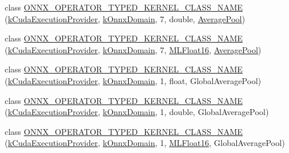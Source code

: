 \begin{DoxyCompactItemize}
\item 
class \mbox{\hyperlink{namespaceonnxruntime_1_1cuda_ad3067b89c02f4a5f6be82c8028514781}{O\+N\+N\+X\+\_\+\+O\+P\+E\+R\+A\+T\+O\+R\+\_\+\+T\+Y\+P\+E\+D\+\_\+\+K\+E\+R\+N\+E\+L\+\_\+\+C\+L\+A\+S\+S\+\_\+\+N\+A\+ME}} (\mbox{\hyperlink{namespaceonnxruntime_a73ebc64887ddd1968e3cef47ffefe35b}{k\+Cuda\+Execution\+Provider}}, \mbox{\hyperlink{namespaceonnxruntime_ac0e7c0c106a2c9e9594560a3ab289fa0}{k\+Onnx\+Domain}}, 7, double, \mbox{\hyperlink{classonnxruntime_1_1AveragePool}{Average\+Pool}})
\item 
class \mbox{\hyperlink{namespaceonnxruntime_1_1cuda_a47aac2996848710ff2bb2fd0638f6d43}{O\+N\+N\+X\+\_\+\+O\+P\+E\+R\+A\+T\+O\+R\+\_\+\+T\+Y\+P\+E\+D\+\_\+\+K\+E\+R\+N\+E\+L\+\_\+\+C\+L\+A\+S\+S\+\_\+\+N\+A\+ME}} (\mbox{\hyperlink{namespaceonnxruntime_a73ebc64887ddd1968e3cef47ffefe35b}{k\+Cuda\+Execution\+Provider}}, \mbox{\hyperlink{namespaceonnxruntime_ac0e7c0c106a2c9e9594560a3ab289fa0}{k\+Onnx\+Domain}}, 7, \mbox{\hyperlink{uniononnxruntime_1_1MLFloat16}{M\+L\+Float16}}, \mbox{\hyperlink{classonnxruntime_1_1AveragePool}{Average\+Pool}})
\item 
class \mbox{\hyperlink{namespaceonnxruntime_1_1cuda_aeedcbf0683595b738f01bfce9fa10987}{O\+N\+N\+X\+\_\+\+O\+P\+E\+R\+A\+T\+O\+R\+\_\+\+T\+Y\+P\+E\+D\+\_\+\+K\+E\+R\+N\+E\+L\+\_\+\+C\+L\+A\+S\+S\+\_\+\+N\+A\+ME}} (\mbox{\hyperlink{namespaceonnxruntime_a73ebc64887ddd1968e3cef47ffefe35b}{k\+Cuda\+Execution\+Provider}}, \mbox{\hyperlink{namespaceonnxruntime_ac0e7c0c106a2c9e9594560a3ab289fa0}{k\+Onnx\+Domain}}, 1, float, Global\+Average\+Pool)
\item 
class \mbox{\hyperlink{namespaceonnxruntime_1_1cuda_ad0765b349cb2924d12a3136537ee7cac}{O\+N\+N\+X\+\_\+\+O\+P\+E\+R\+A\+T\+O\+R\+\_\+\+T\+Y\+P\+E\+D\+\_\+\+K\+E\+R\+N\+E\+L\+\_\+\+C\+L\+A\+S\+S\+\_\+\+N\+A\+ME}} (\mbox{\hyperlink{namespaceonnxruntime_a73ebc64887ddd1968e3cef47ffefe35b}{k\+Cuda\+Execution\+Provider}}, \mbox{\hyperlink{namespaceonnxruntime_ac0e7c0c106a2c9e9594560a3ab289fa0}{k\+Onnx\+Domain}}, 1, double, Global\+Average\+Pool)
\item 
class \mbox{\hyperlink{namespaceonnxruntime_1_1cuda_aa3735b4aafabdcd17b152488004e92f5}{O\+N\+N\+X\+\_\+\+O\+P\+E\+R\+A\+T\+O\+R\+\_\+\+T\+Y\+P\+E\+D\+\_\+\+K\+E\+R\+N\+E\+L\+\_\+\+C\+L\+A\+S\+S\+\_\+\+N\+A\+ME}} (\mbox{\hyperlink{namespaceonnxruntime_a73ebc64887ddd1968e3cef47ffefe35b}{k\+Cuda\+Execution\+Provider}}, \mbox{\hyperlink{namespaceonnxruntime_ac0e7c0c106a2c9e9594560a3ab289fa0}{k\+Onnx\+Domain}}, 1, \mbox{\hyperlink{uniononnxruntime_1_1MLFloat16}{M\+L\+Float16}}, Global\+Average\+Pool)

\end{DoxyCompactItemize}
